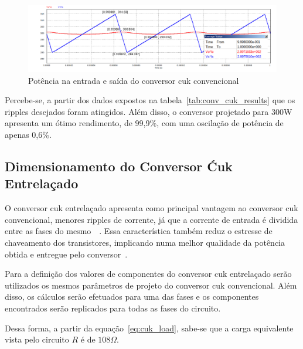 \documentclass[
	12pt,				%
	openright,			%
	twoside,			%
	a4paper,			%
	english,			%
	french,				%
	spanish,			%
	brazil,				%
	]{abntex2}
\begin{document}
\begin{figure}[H]%
	\centering
		\includegraphics[width= \linewidth]{cuk_conv_power_sign}
		\caption{Potência na entrada e saída do conversor cuk convencional}
		\label{fig:cuk_conv_power_sign}
\end{figure}

Percebe-se, a partir dos dados expostos na tabela~\ref{tab:conv_cuk_results} que os ripples desejados foram atingidos. Além disso, o conversor projetado para 300W apresenta um ótimo rendimento, de 99,9\%, com uma oscilação de potência de apenas 0,6\%.


\subsection{Dimensionamento do Conversor Ćuk Entrelaçado}

O conversor cuk entrelaçado apresenta como principal vantagem ao conversor cuk convencional, menores ripples de corrente, já que a corrente de entrada é dividida entre as fases do mesmo~\cite{JOSEPH_2015_Intervealed_CUK}~\cite{JOSEPH_2017_Intervealed_CUK}. Essa característica também reduz o estresse de chaveamento dos transistores, implicando numa melhor qualidade da potência obtida e entregue pelo conversor~\cite{JOSEPH_2017_Intervealed_CUK}.

Para a definição dos valores de componentes do conversor cuk entrelaçado serão utilizados os mesmos parâmetros de projeto do conversor cuk convencional. Além disso, os cálculos serão efetuados para uma das fases e os componentes encontrados serão replicados para todas as fases do circuito.

Dessa forma, a partir da equação~\ref{eq:cuk_load}, sabe-se que a carga equivalente vista pelo circuito $R$ é de $108\Omega$.
\end{document}
